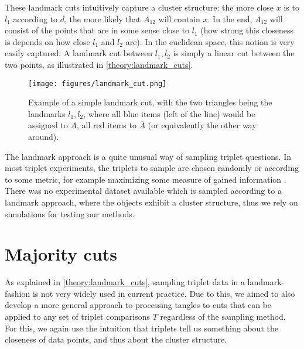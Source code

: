 These landmark cuts intuitively capture a cluster structure: the more close $x$ is to $l_1$ according to $d$, the more likely that $A_{12}$ will contain $x$. In the end, $A_{12}$ will
consist of the points that are in some sense close to $l_1$ (how strong this closeness is depends on how close $l_1$ and $l_2$ are). 
In the euclidean space, this notion is very easily captured: A landmark cut between $l_1, l_2$ is
simply a linear cut between the two points, as illustrated in \autoref{theory:landmark_cuts}.

    \begin{figure}[ht]
        \centering
        \texttt{[image: figures/landmark\_cut.png]}
        \caption{Example of a simple landmark cut, with the two triangles being the landmarks $l_1, l_2$, where all blue items (left of the line) 
        would be assigned to $A$, all red items to $\overline{A}$ (or equivalently the other way around).}
        \label{fig:landmark_cut}
    \end{figure}

The landmark approach is a quite unusual way of sampling triplet questions.
In most triplet experiments, the triplets to sample are chosen randomly \citep{kleindessnerLensDepthFunction2017, haghiriEstimationPerceptualScales2020} 
or according to some metric, for example maximizing some measure of gained information \citep{roadsEnrichingImageNetHuman2021}. 
There was no experimental dataset available which is sampled according to a landmark approach, where the objects exhibit a cluster structure, thus we rely on simulations
for testing our methods.

\section{Majority cuts}
As explained in \autoref{theory:landmark_cuts}, sampling triplet data in a landmark-fashion is not very widely used in current practice. Due to this, we aimed
to also develop a more general approach to processing tangles to cuts that can be applied to any set of triplet comparisons $T$ regardless of the sampling method.
For this, we again use the intuition that triplets tell us something about the closeness of data points, and thus about the cluster structure. 

